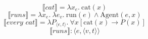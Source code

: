 \documentclass{article}
\newcommand{\sv}[1]{\llbracket #1 \rrbracket}
\begin{document}
\begin{center}
\begin{minipage}{0.96\linewidth}
\[
\sv{\textit{cat}} = \lambda x_e .\ \text{cat}(x)
\]
\[
\sv{\textit{runs}} = \lambda x_e .\ \lambda e_v .\
\text{run}(e) \wedge \text{Agent}(e,x)
\]
\[
\sv{\textit{every cat}} = \lambda P_{\langle e,t \rangle} .\
\forall x[\text{cat}(x) \rightarrow P(x)]
\]
\[
\sv{\textit{runs}} : \langle e,\langle v,t\rangle\rangle
\]
\end{minipage}
\end{center}
\end{document}
